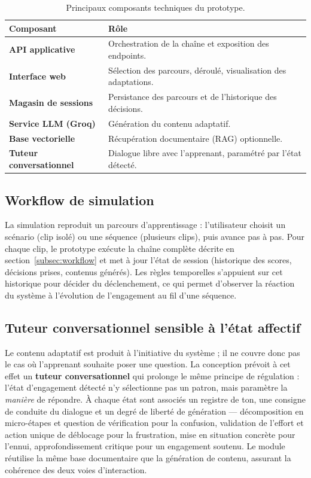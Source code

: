 \begin{table}[H]
\centering
\renewcommand{\arraystretch}{1.2}
\begin{tabular}{>{\bfseries}l p{8.8cm}}
\toprule
Composant & Rôle \\
\midrule
API applicative      & Orchestration de la chaîne et exposition des endpoints. \\
Interface web        & Sélection des parcours, déroulé, visualisation des adaptations. \\
Magasin de sessions  & Persistance des parcours et de l'historique des décisions. \\
Service LLM (Groq)   & Génération du contenu adaptatif. \\
Base vectorielle     & Récupération documentaire (RAG) optionnelle. \\
Tuteur conversationnel & Dialogue libre avec l'apprenant, paramétré par l'état détecté. \\
\bottomrule
\end{tabular}
\caption{Principaux composants techniques du prototype.}
\label{tab:stack}
\end{table}

\subsection{Workflow de simulation}

La simulation reproduit un parcours d'apprentissage : l'utilisateur choisit un
scénario (clip isolé) ou une séquence (plusieurs clips), puis avance pas à pas.
Pour chaque clip, le prototype exécute la chaîne complète décrite en
section~\ref{subsec:workflow} et met à jour l'état de session (historique des
scores, décisions prises, contenus générés). Les règles temporelles s'appuient sur
cet historique pour décider du déclenchement, ce qui permet d'observer la réaction
du système à l'évolution de l'engagement au fil d'une séquence.

\subsection{Tuteur conversationnel sensible à l'état affectif}

Le contenu adaptatif est produit à l'initiative du système ; il ne couvre donc pas
le cas où l'apprenant souhaite poser une question. La conception prévoit à cet
effet un \textbf{tuteur conversationnel} qui prolonge le même principe de
régulation : l'état d'engagement détecté n'y sélectionne pas un patron, mais
paramètre la \emph{manière} de répondre. À chaque état sont associés un registre
de ton, une consigne de conduite du dialogue et un degré de liberté de génération
— décomposition en micro-étapes et question de vérification pour la confusion,
validation de l'effort et action unique de déblocage pour la frustration, mise en
situation concrète pour l'ennui, approfondissement critique pour un engagement
soutenu. Le module réutilise la même base documentaire que la génération de
contenu, assurant la cohérence des deux voies d'interaction.


